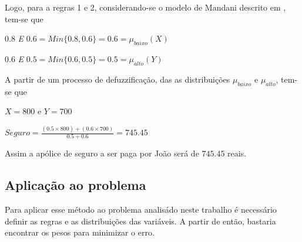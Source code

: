  Logo, para a regras 1 e 2, considerando-se o modelo de Mandani descrito em \cite{passos2005datamining}, tem-se que 
 \begin{description}
   \item $0.8$ \emph{E} $0.6 = Min \lbrace 0.8,0.6 \rbrace = 0.6 = \mu_{baixo}(X)$ 
   \item $0.6$ \emph{E} $0.5 = Min \lbrace 0.6,0.5 \rbrace = 0.5 = \mu_{alto}(Y)$
 \end{description}
 
 A partir de um processo de defuzzificação, das as distribuições $\mu_{baixo}$ e $\mu_{alto}$, tem-se que
 \begin{description}
   \item $X = 800$ e $Y=700$
   \item $Seguro = \frac{(0.5 \times 800)+(0.6 \times 700)}{0.5 + 0.6} = 745.45$
 \end{description}
 
 Assim a apólice de seguro a ser paga por João será de $745.45$ reais.

\subsection{Aplicação ao problema}

Para aplicar esse método ao problema analisádo neste trabalho é necessário definir as regras e as distribuições
das variáveis. A partir de então, bastaria encontrar os pesos para minimizar o erro.
